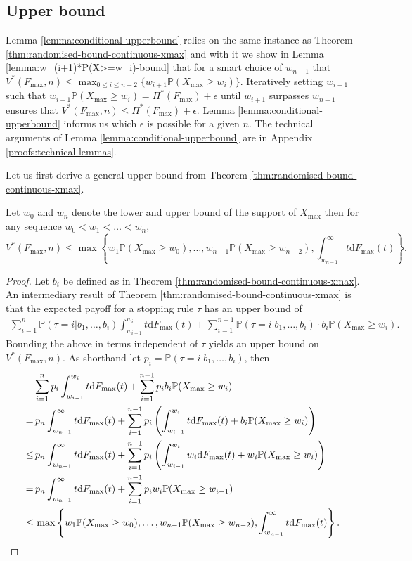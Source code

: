 \documentclass[11pt,a4paper]{article}
\numberwithin{equation}{section}
\begin{document}
\subsection{Upper bound}
Lemma \ref{lemma:conditional-upperbound} relies on the same instance as Theorem \ref{thm:randomised-bound-continuous-xmax} and with it we show in Lemma \ref{lemma:w_(i+1)*P(X>=w_i)-bound} that for a smart choice of $w_{n-1}$ that $V^*(F_{\max},n)\le \max_{0\le i\le n-2}\{w_{i+1}\mathbb{P}(X_{\max}\ge w_i)\}$. Iteratively setting $w_{i+1}$ such that $w_{i+1}\mathbb{P}(X_{\max}\ge w_i)=\Pi^*(F_{\max})+\epsilon$ until $w_{i+1}$ surpasses $w_{n-1}$ ensures that $V^*(F_{\max},n)\le\Pi^*(F_{\max})+\epsilon$. Lemma \ref{lemma:conditional-upperbound} informs us which $\epsilon$ is possible for a given $n$. The technical arguments of Lemma \ref{lemma:conditional-upperbound} are in Appendix \ref{proofs:technical-lemmas}. 

Let us first derive a general upper bound from Theorem \ref{thm:randomised-bound-continuous-xmax}.
\begin{lemma}
\label{lemma:w_(i+1)*P(X>=w_i)-bound}
    Let $w_0$ and $w_n$ denote the lower and upper bound of the support of $X_{\max}$ then for any sequence $w_0<w_1<\dots<w_n$,
    $$V^*(F_{\max}, n)\le\max\left\{w_1\mathbb{P}(X_{\max}\ge w_0),\dots,w_{n-1}\mathbb{P}(X_{\max}\ge w_{n-2}),\int_{w_{n-1}}^\infty t\mathrm{d}F_{\max}(t)\right\}.$$
\end{lemma}
\begin{proof}
    Let $b_i$ be defined as in Theorem \ref{thm:randomised-bound-continuous-xmax}. An intermediary result of Theorem \ref{thm:randomised-bound-continuous-xmax} is that the expected payoff for a stopping rule $\tau$ has an upper bound of
    \begin{align*}
        \sum_{i=1}^n\mathbb{P}(\tau=i | b_1,\dots,b_i) \int_{w_{i-1}}^{w_i}t\mathrm{d}F_{\max}(t)+\sum_{i=1}^{n-1}\mathbb{P}(\tau=i | b_1,\dots,b_i)\cdot b_i\mathbb{P}(X_{\max}\ge w_i).
    \end{align*}
    Bounding the above in terms independent of $\tau$ yields an upper bound on $V^*(F_{\max}, n)$.
    As shorthand let $p_i=\mathbb{P}(\tau=i | b_1,\dots,b_i)$, then 
    \begin{align*}
        &\sum_{i=1}^np_i \int_{w_{i-1}}^{w_i}t\mathrm{d}F_{\max}(t)+\sum_{i=1}^{n-1}p_ib_i\mathbb{P}(X_{\max}\ge w_i)\\
        =&\,p_n\int_{w_{n-1}}^\infty t\mathrm{d}F_{\max}(t)+\sum_{i=1}^{n-1}p_i\left( \int_{w_{i-1}}^{w_i}t\mathrm{d}F_{\max}(t)+b_i\mathbb{P}(X_{\max}\ge w_i)\right)\\
        \le &\,p_n\int_{w_{n-1}}^\infty t\mathrm{d}F_{\max}(t)+\sum_{i=1}^{n-1}p_i\left( \int_{w_{i-1}}^{w_i}w_i\mathrm{d}F_{\max}(t)+w_i\mathbb{P}(X_{\max}\ge w_i)\right)\\
        =&\,p_n\int_{w_{n-1}}^\infty t\mathrm{d}F_{\max}(t)+\sum_{i=1}^{n-1}p_iw_i\mathbb{P}(X_{\max}\ge w_{i-1})\\
        \le& \,\max\left\{w_1\mathbb{P}(X_{\max}\ge w_0),\dots,w_{n-1}\mathbb{P}(X_{\max}\ge w_{n-2}),\int_{w_{n-1}}^\infty t\mathrm{d}F_{\max}(t)\right\}. \qedhere
    \end{align*}
\end{proof}
\end{document}
